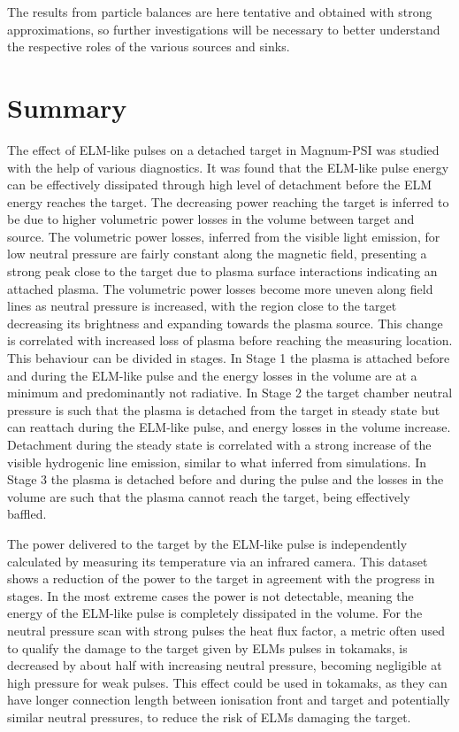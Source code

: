 The results from particle balances are here tentative and obtained with strong approximations, so further investigations will be necessary to better understand the respective roles of the various sources and sinks.


\section{Summary}\label{summary magnum-psi}

The effect of ELM-like pulses on a detached target in Magnum-PSI was studied with the help of various diagnostics. It was found that the ELM-like pulse energy can be effectively dissipated through high level of detachment before the ELM energy reaches the target. The decreasing power reaching the target is inferred to be due to higher volumetric power losses in the volume between target and source. The volumetric power losses, inferred from the visible light emission, for low neutral pressure are fairly constant along the magnetic field, presenting a strong peak close to the target due to plasma surface interactions indicating an attached plasma. The volumetric power losses become more uneven along field lines as neutral pressure is increased, with the region close to the target decreasing its brightness and expanding towards the plasma source. This change is correlated with increased loss of plasma before reaching the measuring location. This behaviour can be divided in stages. In Stage 1 the plasma is attached before and during the ELM-like pulse and the energy losses in the volume are at a minimum and predominantly not radiative. In Stage 2 the target chamber neutral pressure is such that the plasma is detached from the target in steady state but can reattach during the ELM-like pulse, and energy losses in the volume increase. Detachment during the steady state is correlated with a strong increase of the visible hydrogenic line emission, similar to what inferred from simulations.\cite{Zhou2022} In Stage 3 the plasma is detached before and during the pulse and the losses in the volume are such that the plasma cannot reach the target, being effectively baffled.

The power delivered to the target by the ELM-like pulse is independently calculated by measuring its temperature via an infrared camera. This dataset shows a reduction of the power to the target in agreement with the progress in stages. In the most extreme cases the power is not detectable, meaning the energy of the ELM-like pulse is completely dissipated in the volume. For the neutral pressure scan with strong pulses the heat flux factor, a metric often used to qualify the damage to the target given by ELMs pulses in tokamaks, is decreased by about half with increasing neutral pressure, becoming negligible at high pressure for weak pulses. This effect could be used in tokamaks, as they can have longer connection length between ionisation front and target and potentially similar neutral pressures, to reduce the risk of ELMs damaging the target.


